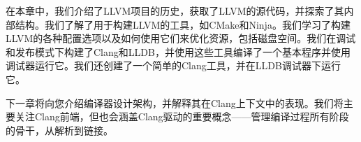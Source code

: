 在本章中，我们介绍了LLVM项目的历史，获取了LLVM的源代码，并探索了其内部结构。我们了解了用于构建LLVM的工具，如CMake和Ninja。我们学习了构建LLVM的各种配置选项以及如何使用它们来优化资源，包括磁盘空间。我们在调试和发布模式下构建了Clang和LLDB，并使用这些工具编译了一个基本程序并使用调试器运行它。我们还创建了一个简单的Clang工具，并在LLDB调试器下运行它。

下一章将向您介绍编译器设计架构，并解释其在Clang上下文中的表现。我们将主要关注Clang前端，但也会涵盖Clang驱动的重要概念——管理编译过程所有阶段的骨干，从解析到链接。